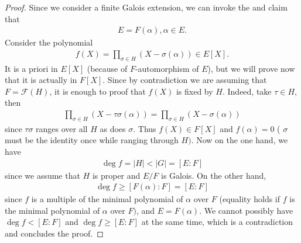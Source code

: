 \documentclass{article}
\begin{document}
\begin{proof}
Since we consider a finite Galois extension, we can invoke the  and claim that
\begin{align*}
E=F(\alpha), \alpha \in E .
\end{align*}
Consider the polynomial
\begin{align*}
f(X)=\prod_{\sigma \in H}(X-\sigma(\alpha)) \in E[X] .
\end{align*}
It is a priori in $E[X]$ (because of $F$-automorphism of $E$), but we will prove now that it is actually in $F[X]$. Since by contradiction we are assuming that $F=\mathcal{F}(H)$, it is enough to proof that $f(X)$ is fixed by $H$. Indeed, take $\tau \in H$, then
\begin{align*}
\prod_{\sigma \in H}(X-\tau \sigma(\alpha))=\prod_{\sigma \in H}(X-\sigma(\alpha))
\end{align*}
since $\tau \sigma$ ranges over all $H$ as does $\sigma$.
Thus $f(X) \in F[X]$ and $f(\alpha)=0$ ( $\sigma$ must be the identity once while ranging through $H)$. Now on the one hand, we have
\begin{align*}
\operatorname{deg} f=|H|<|G|=[E: F]
\end{align*}
since we assume that $H$ is proper and $E / F$ is Galois. On the other hand,
\begin{align*}
\operatorname{deg} f \geq[F(\alpha): F]=[E: F]
\end{align*}
since $f$ is a multiple of the minimal polynomial of $\alpha$ over $F$ (equality holds if $f$ is the minimal polynomial of $\alpha$ over $F)$, and $E=F(\alpha)$. We cannot possibly have $\operatorname{deg} f<[E: F]$ and $\operatorname{deg} f \geq[E: F]$ at the same time, which is a contradiction and concludes the proof.
\end{proof}
\end{document}
